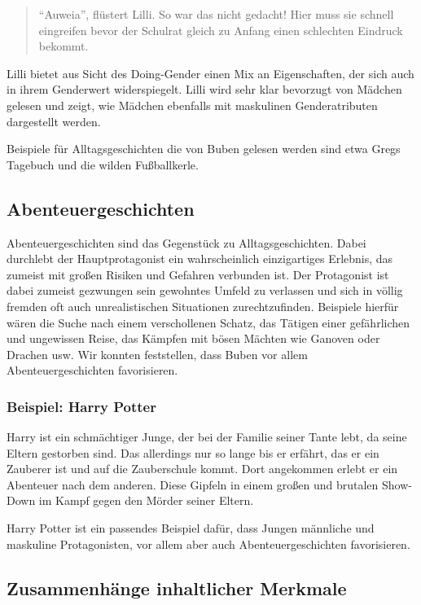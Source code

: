 \begin{quote}
``Auweia'', flüstert Lilli. So war das nicht gedacht! Hier muss sie
schnell eingreifen bevor der Schulrat gleich zu Anfang einen schlechten
Eindruck bekommt. \parencite[][47
]{KNISTER1999}
\end{quote}

Lilli bietet aus Sicht des Doing-Gender einen Mix an Eigenschaften, der
sich auch in ihrem Genderwert widerspiegelt. Lilli wird sehr klar
bevorzugt von Mädchen gelesen und zeigt, wie Mädchen ebenfalls mit
maskulinen Genderatributen dargestellt werden.

Beispiele für Alltagsgeschichten die von Buben gelesen werden sind etwa
Gregs Tagebuch und die wilden Fußballkerle.

\subsection{Abenteuergeschichten}

Abenteuergeschichten sind das Gegenstück zu Alltagsgeschichten. Dabei
durchlebt der Hauptprotagonist ein wahrscheinlich einzigartiges
Erlebnis, das zumeist mit großen Risiken und Gefahren verbunden ist. Der
Protagonist ist dabei zumeist gezwungen sein gewohntes Umfeld zu
verlassen und sich in völlig fremden oft auch unrealistischen
Situationen zurechtzufinden. Beispiele hierfür wären die Suche nach
einem verschollenen Schatz, das Tätigen einer gefährlichen und
ungewissen Reise, das Kämpfen mit bösen Mächten wie Ganoven oder Drachen
usw. Wir konnten feststellen, dass Buben vor allem Abenteuergeschichten
favorisieren.

\subsubsection{Beispiel: Harry Potter}

Harry ist ein schmächtiger Junge, der bei der Familie seiner Tante lebt,
da seine Eltern gestorben sind. Das allerdings nur so lange bis er
erfährt, das er ein Zauberer ist und auf die Zauberschule kommt. Dort
angekommen erlebt er ein Abenteuer nach dem anderen. Diese Gipfeln in
einem großen und brutalen Show-Down im Kampf gegen den Mörder seiner
Eltern. \parencite{Rowling1998}

Harry Potter ist ein passendes Beispiel dafür, dass Jungen männliche und
maskuline Protagonisten, vor allem aber auch Abenteuergeschichten
favorisieren.

\subsection{Zusammenhänge inhaltlicher Merkmale}

